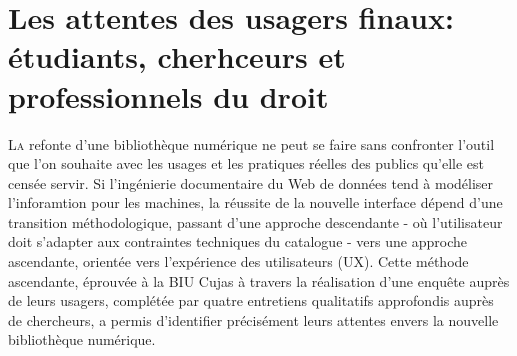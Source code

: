 \chapter[Les attentes des usagers]{Les attentes des usagers finaux: étudiants, cherhceurs et professionnels du droit}

\lettrine{L}a refonte d'une bibliothèque numérique ne peut se faire sans confronter l'outil que l'on souhaite avec les usages et les pratiques réelles des publics qu'elle est censée servir. Si l'ingénierie documentaire du Web de données tend à modéliser l'inforamtion pour les machines, la réussite de la nouvelle interface dépend d'une transition méthodologique, passant d'une approche descendante - où l'utilisateur doit s'adapter aux contraintes techniques du catalogue - vers une approche ascendante, orientée vers l'expérience des utilisateurs (UX). Cette méthode ascendante, éprouvée à la BIU Cujas à travers la réalisation d'une enquête auprès de leurs usagers, complétée par quatre entretiens qualitatifs approfondis auprès de chercheurs, a permis d'identifier précisément leurs attentes envers la nouvelle bibliothèque numérique.




